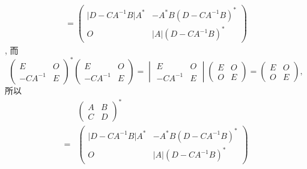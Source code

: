 \begin{exercise}
\begin{exgroup}
\begin{answer}
\begin{enumerate}
\begin{align*}
                          = \begin{pmatrix}
                                \lvert D-CA^{-1}B \rvert A^* & -A^*B(D-CA^{-1}B)^*            \\
                                O                            & \lvert A \rvert (D-CA^{-1}B)^*
                            \end{pmatrix}
                      \end{align*},
                      而
                      \[\begin{pmatrix}
                              E        & O \\
                              -CA^{-1} & E
                          \end{pmatrix}^* \begin{pmatrix}
                              E        & O \\
                              -CA^{-1} & E
                          \end{pmatrix} = \begin{vmatrix}
                              E        & O \\
                              -CA^{-1} & E
                          \end{vmatrix} \begin{pmatrix}
                              E & O \\
                              O & E
                          \end{pmatrix} = \begin{pmatrix}
                              E & O \\
                              O & E
                          \end{pmatrix},\]
                      所以
                      \begin{align*}
                              & \begin{pmatrix}
                                    A & B \\
                                    C & D
                                \end{pmatrix}^*                                                                         \\
                          ={} & \begin{pmatrix}
                                    \lvert D-CA^{-1}B \rvert A^* & -A^*B(D-CA^{-1}B)^*            \\
                                    O                            & \lvert A \rvert (D-CA^{-1}B)^*

\end{pmatrix}
\end{align*}
\end{enumerate}
\end{answer}
\end{exgroup}
\end{exercise}

